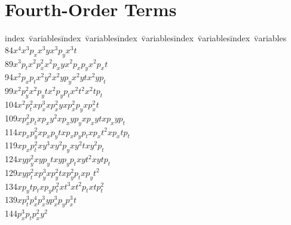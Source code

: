 \section{Fourth-Order Terms}
\indent
\begin{tabbing}
index\ \=variables\kern1cm\=index\ \=variables\kern1cm\=
index\ \=variables\kern1cm\=index\ \=variables\kern1cm\=
index\ \=variables\\
 84\>$x  ^4             $\>$x  ^3 p_x         $\>$x  ^3 y           $\>$x  ^3 p_y         $\>$x  ^3 t           $\\
 89\>$x  ^3 p_t         $\>$x  ^2 p_x^2       $\>$x  ^2 p_xy        $\>$x  ^2 p_xp_y      $\>$x  ^2 p_xt        $\\
 94\>$x  ^2 p_xp_t      $\>$x  ^2 y  ^2       $\>$x  ^2 y  p_y      $\>$x  ^2 y  t        $\>$x  ^2 y  p_t      $\\
 99\>$x  ^2 p_y^2       $\>$x  ^2 p_yt        $\>$x  ^2 p_yp_t      $\>$x  ^2 t  ^2       $\>$x  ^2 t  p_t      $\\
104\>$x  ^2 p_t^2       $\>$x  p_x^3          $\>$x  p_x^2 y        $\>$x  p_x^2 p_y      $\>$x  p_x^2 t        $\\
109\>$x  p_x^2 p_t      $\>$x  p_xy  ^2       $\>$x  p_xy  p_y      $\>$x  p_xy  t        $\>$x  p_xy  p_t      $\\
114\>$x  p_xp_y^2       $\>$x  p_xp_yt        $\>$x  p_xp_yp_t      $\>$x  p_xt  ^2       $\>$x  p_xt  p_t      $\\
119\>$x  p_xp_t^2       $\>$x  y  ^3          $\>$x  y  ^2 p_y      $\>$x  y  ^2 t        $\>$x  y  ^2 p_t      $\\
124\>$x  y  p_y^2       $\>$x  y  p_yt        $\>$x  y  p_yp_t      $\>$x  y  t  ^2       $\>$x  y  t  p_t      $\\
129\>$x  y  p_t^2       $\>$x  p_y^3          $\>$x  p_y^2 t        $\>$x  p_y^2 p_t      $\>$x  p_yt  ^2       $\\
134\>$x  p_yt  p_t      $\>$x  p_yp_t^2       $\>$x  t  ^3          $\>$x  t  ^2 p_t      $\>$x  t  p_t^2       $\\
139\>$x  p_t^3          $\>$p_x^4             $\>$p_x^3 y           $\>$p_x^3 p_y         $\>$p_x^3 t           $\\
144\>$p_x^3 p_t         $\>$p_x^2 y  ^2       $\>

\end{tabbing}
